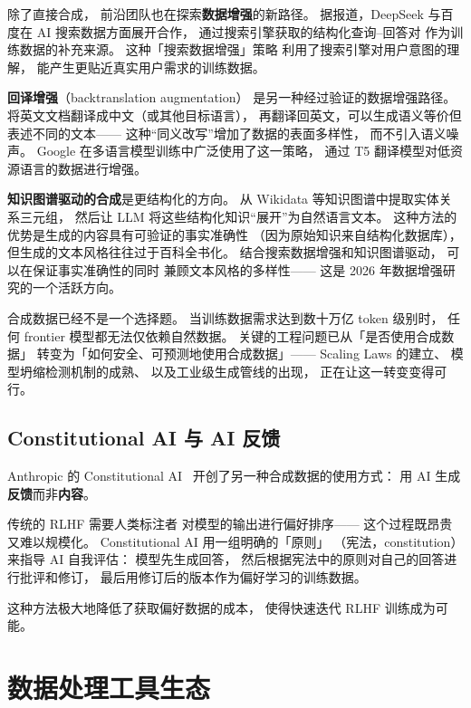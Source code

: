 除了直接合成，
前沿团队也在探索\textbf{数据增强}的新路径。
据报道，DeepSeek 与百度在 AI 搜索数据方面展开合作，
通过搜索引擎获取的结构化查询--回答对
作为训练数据的补充来源。
这种「搜索数据增强」策略
利用了搜索引擎对用户意图的理解，
能产生更贴近真实用户需求的训练数据。

\textbf{回译增强}（backtranslation augmentation）
是另一种经过验证的数据增强路径。
将英文文档翻译成中文（或其他目标语言），
再翻译回英文，可以生成语义等价但表述不同的文本——
这种``同义改写''增加了数据的表面多样性，
而不引入语义噪声。
Google 在多语言模型训练中广泛使用了这一策略，
通过 T5 翻译模型对低资源语言的数据进行增强。

\textbf{知识图谱驱动的合成}是更结构化的方向。
从 Wikidata 等知识图谱中提取实体关系三元组，
然后让 LLM 将这些结构化知识``展开''为自然语言文本。
这种方法的优势是生成的内容具有可验证的事实准确性
（因为原始知识来自结构化数据库），
但生成的文本风格往往过于百科全书化。
结合搜索数据增强和知识图谱驱动，
可以在保证事实准确性的同时
兼顾文本风格的多样性——
这是 2026 年数据增强研究的一个活跃方向。

\begin{warnbox}[2026 年的合成数据现实]
合成数据已经不是一个选择题。
当训练数据需求达到数十万亿 token 级别时，
任何 frontier 模型都无法仅依赖自然数据。
关键的工程问题已从「是否使用合成数据」
转变为「如何安全、可预测地使用合成数据」——
Scaling Laws 的建立、
模型坍缩检测机制的成熟、
以及工业级生成管线的出现，
正在让这一转变变得可行。
\end{warnbox}

\subsection{Constitutional AI 与 AI 反馈}

Anthropic 的 Constitutional AI~\cite{bai2022constitutional}
开创了另一种合成数据的使用方式：
用 AI 生成\textbf{反馈}而非\textbf{内容}。

传统的 RLHF 需要人类标注者
对模型的输出进行偏好排序——
这个过程既昂贵又难以规模化。
Constitutional AI 用一组明确的「原则」
（宪法，constitution）来指导 AI 自我评估：
模型先生成回答，
然后根据宪法中的原则对自己的回答进行批评和修订，
最后用修订后的版本作为偏好学习的训练数据。

这种方法极大地降低了获取偏好数据的成本，
使得快速迭代 RLHF 训练成为可能。

\section{数据处理工具生态}

